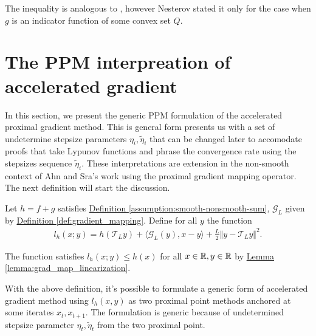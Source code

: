 \documentclass[12pt]{article}
\begin{document}
    \begin{remark}
        The inequality is analogous to \cite[(2.2.57)]{nesterov_lectures_2018}, however Nesterov stated it only for the case when $g$ is an indicator function of some convex set $Q$. 
    \end{remark}

\section{The PPM interpreation of accelerated gradient}\label{sec:ppm_interp_of_ag}
    In this section, we present the generic PPM formulation of the accelerated proximal gradient method. 
    This is general form presents us with a set of undetermine stepsize parameters $\eta_i, \tilde \eta_i$ that can be changed later to accomodate proofs that take Lypunov functions and phrase the convergence rate using the stepsizes sequence $\tilde \eta_i$. 
    These interpretations are extension in the non-smooth context of Ahn and Sra's work \cite{ahn_understanding_2022} using the proximal gradient mapping operator. 
    The next definition will start the discussion. 
    \begin{definition}\label{def:gradmap-linear-lowerbnd-fxn}
        Let $h = f+ g$ satisfies
        \hyperref[assumption:smooth-nonsmooth-sum]{Definition \ref*{assumption:smooth-nonsmooth-sum}}, 
        $\mathcal G_L$ given by 
        \hyperref[def:gradient_mapping]{Definition \ref*{def:gradient_mapping}}. 
        Define for all $y$ the function
        \begin{align*}
            l_h(x; y) = h(\mathcal T_L y) + \langle \mathcal G_L(y), x - y \rangle 
            + \frac{L}{2}\Vert y - \mathcal T_L y\Vert^2. 
        \end{align*}
    \end{definition} 
    \begin{remark}
        The function satisfies $l_h(x; y) \le h(x)$ for all $x \in \mathbb R, y \in \mathbb R$ by 
        \hyperref[lemma:grad_map_linearization]
        {Lemma \ref*{lemma:grad_map_linearization}}. 
    \end{remark}
    \par
    With the above definition, it's possible to formulate a generic form of accelerated gradient method using $l_h(x,y)$ as two proximal point methods anchored at some iterates $x_t, x_{t + 1}$.
    The formulation is generic because of undetermined stepsize parameter $\eta_t, \tilde \eta_t$ from the two proximal point. 
\end{document}
